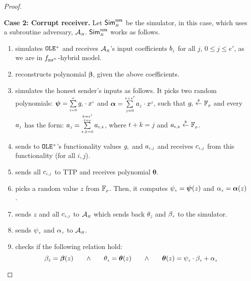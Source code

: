 \begin{proof}
\


\noindent\textbf{Case 2: Corrupt receiver.}  Let $\mathsf{Sim}^{\scriptscriptstyle\mathtt{VOPR}}_{\scriptscriptstyle R}$ be the simulator, in this case, which uses a subroutine adversary, $\mathcal{A}_{\scriptscriptstyle R}$. $\mathsf{Sim}^{\scriptscriptstyle \mathtt{VOPR}}_{\scriptscriptstyle R}$ works as follows. 
%
\begin{enumerate}
%
\item simulates ${\mathtt{OLE}^{\scriptscriptstyle +}}$ and receives $\mathcal{A}_{\scriptscriptstyle R}$'s input coefficients $b_{\scriptscriptstyle j}$ for all $j$, $0\leq j \leq e'$, as we are in $f_{\scriptscriptstyle \mathtt{OLE}^{\scriptscriptstyle +}}$-hybrid model.
%
\item reconstructs polynomial $\bm \beta$, given the above coefficients. 
%
\item simulates the honest sender's inputs as follows. 
It picks two random polynomials: ${\bm\psi}=\sum\limits^{\scriptscriptstyle e}_{\scriptscriptstyle i=0}{g}_{\scriptscriptstyle i}\cdot x^{\scriptscriptstyle i}$ and  ${\bm\alpha}=\sum\limits^{\scriptscriptstyle e+e'}_{\scriptscriptstyle j=0}{a}_{\scriptscriptstyle j}\cdot x^{\scriptscriptstyle j}$, such that ${g}_{\scriptscriptstyle i}\stackrel{\scriptscriptstyle \$}\leftarrow \mathbb{F}_{\scriptscriptstyle p}$ and  every $a_{\scriptscriptstyle j}$ has the  form: $a_{\scriptscriptstyle j}=\sum\limits^{\substack{\scriptscriptstyle k=e'\\ \scriptscriptstyle t=e}}_{\scriptscriptstyle t,k=0} a_{\scriptscriptstyle t,k}$,  where $t+k=j$ and $a_{\scriptscriptstyle t,k}\stackrel{\scriptscriptstyle \$}\leftarrow \mathbb{F}_{\scriptscriptstyle p}$. 
\item sends to ${\mathtt{OLE}^{\scriptscriptstyle +}}$'s functionality values $g_{\scriptscriptstyle i}$ and $a_{\scriptscriptstyle i,j}$ and receives   $c_{\scriptscriptstyle i,j}$ from this functionality (for all $i,j$).
%
\item sends all ${c}_{\scriptscriptstyle i,j}$ to TTP and receives polynomial ${\bm\theta}$. 
%
\item picks a random value $ z$ from $\mathbb{F}_{\scriptscriptstyle p}$. Then, it computes $ \psi_{\scriptscriptstyle  z} = {\bm\psi}(  z)$ and $\alpha_{\scriptscriptstyle  z}= {\bm\alpha}(z)$. 
%
\item sends $ z$ and all ${c}_{\scriptscriptstyle i,j}$ to $\mathcal{A}_{\scriptscriptstyle R}$ which sends back $\theta_{ z}$ and $\beta_{\scriptscriptstyle z}$ to the simulator. 
%
\item sends  $ \psi_{\scriptscriptstyle  z}$ and $\alpha_{\scriptscriptstyle z}$ to $\mathcal{A}_{\scriptscriptstyle R}$. 
%
\item checks if the following relation hold:
%
\begin{equation}\label{equ::beta}
 \beta_{\st \bar z}={\bm\beta}( z) \hspace{6mm} \wedge \hspace{6mm} \theta_{\st  z}={\bm\theta}( z) \hspace{6mm}\wedge\hspace{6mm} {\bm\theta}( z)=  \psi_{\st  z}\cdot \beta_{\st  z}+\alpha_{\st  z}

\end{equation}
\end{enumerate}
\end{proof}
